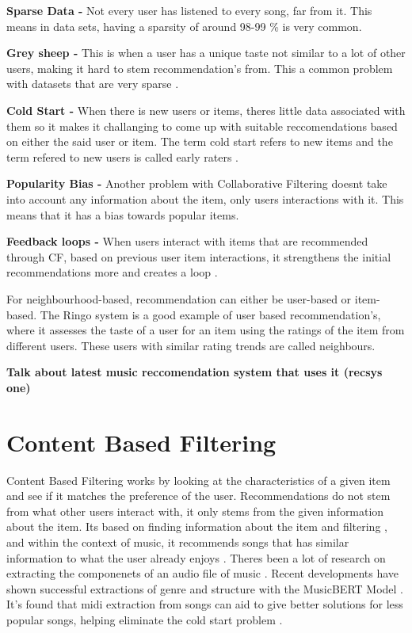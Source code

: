 \textbf{Sparse Data - }Not every user has listened to every song, far from it. This means in data sets, having a sparsity of around 98-99 \% is very common.

\textbf{Grey sheep - }This is when a user has a unique taste not similar to a lot of other users, making it hard to stem recommendation's from. This a common problem with datasets that are very sparse \citep{claypool_combining_1999}.

\textbf{Cold Start - } When there is new users or items, theres little data associated with them so it makes it challanging to come up with suitable reccomendations based on either the said user or item. The term cold start refers to new items and the term refered to new users is called early raters \citep{avery_recommender_1997}.

\textbf{Popularity Bias - } Another problem with Collaborative Filtering doesnt take into account any information about the item, only users interactions with it. This means that it has a bias towards popular items.

\textbf{Feedback loops - } When users interact with items that are recommended through CF, based on previous user item interactions, it strengthens the initial recommendations more and creates a loop \citep{sanchez-moreno_incorporating_2018}.


For neighbourhood-based, recommendation can either be user-based or item-based. The Ringo system is a good example of user based recommendation's, where it assesses the taste of a user for an item using the ratings of the item from different users. These users with similar rating trends are called neighbours. 

\textbf{Talk about latest music reccomendation system that uses it (recsys one)}
\section{Content Based Filtering}

Content Based Filtering works by looking at the characteristics of a given item and see if it matches the preference of the user. Recommendations do not stem from what other users interact with, it only stems from the given information about the item. Its based on finding information about the item and filtering \citep{casey_content-based_2008}, and within the context of music, it recommends songs that has similar information to what the user already enjoys \citep{aucouturier_music_2002} \citep{logan_music_2004}. Theres been a lot of research on extracting the componenets of an audio file of music \citep{ribecky_multi-input_2021} \citep{zhao_musical_2022}. Recent developments have shown successful extractions of genre and structure with the MusicBERT Model \citep{zhu_musicbert_2021}. It's found that midi extraction from songs can aid to give better solutions for less popular songs, helping eliminate the cold start problem \citep{yadav_improved_2022}.

